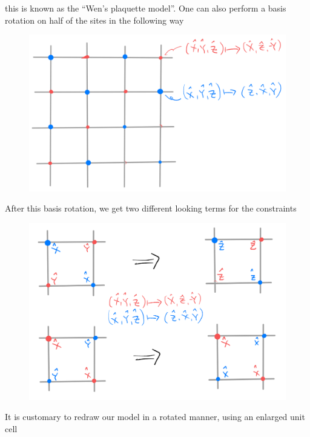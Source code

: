 this is known as the ``Wen's plaquette model''. One can also perform a basis rotation on half of the sites in the following way
\begin{figure}[H]
    \centering
    \includegraphics[width=\textwidth]{jupyterbook/data/fig/lec26-fig18.png}
\end{figure}
After this basis rotation, we get two different looking terms for the constraints
\begin{figure}[H]
    \centering
    \includegraphics[width=\textwidth]{jupyterbook/data/fig/lec26-fig19.png}
\end{figure}
It is customary to redraw our model in a rotated manner, using an enlarged unit cell
